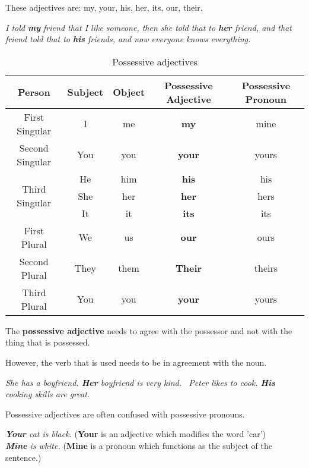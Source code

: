 \documentclass[hidelinks,10pt,a4paper]{article}
\begin{document}
These adjectives are: my, your, his, her, its, our, their.

\begin{center}
	\textit{I told \textbf{my} friend that I like someone, then she told that to \textbf{her} friend, and that friend told that to \textbf{his} friends, and now everyone knows everything. }
\end{center}

\begin{table}[h]
\begin{center}
\begin{tabular}{|c|c|c|c|c|}
	\hline
	\textbf{Person} & \textbf{Subject} & \textbf{Object} & \textbf{Possessive Adjective} & \textbf{Possessive Pronoun} \\ \hline
	First Singular & I & me & \textbf{my} & mine \\ \hline
	Second Singular & You & you & \textbf{your} & yours \\ \hline
	\multirow{3}{*}{Third Singular} & He & him & \textbf{his} & his \\ \hline
	 & She & her & \textbf{her} & hers \\ \hline
	 & It & it & \textbf{its} & its \\ \hline
	First Plural & We & us & \textbf{our} & ours \\ \hline
	Second Plural & They & them & \textbf{Their} & theirs \\ \hline
	Third Plural & You & you & \textbf{your} & yours \\ \hline
\end{tabular}
\end{center}
\caption{Possessive adjectives} \label{tab:posa1}
\end{table}

The \textbf{possessive adjective} needs to agree with the possessor and not with the thing that is possessed.

However, the verb that is used needs to be in agreement with the noun.

\begin{center}
	\textit{She has a boyfriend. \textbf{Her} boyfriend is very kind. \
	Peter likes to cook. \textbf{His} cooking skills are great.}
\end{center}

Possessive adjectives are often confused with possessive pronouns.

\begin{center}
	\textit{\textbf{Your} cat is black.} (\textbf{Your} is an adjective which modifies the word 'car') \\
	\textit{\textbf{Mine} is white.} (\textbf{Mine} is a pronoun which functions as the subject of the sentence.)
\end{center}
\end{document}
